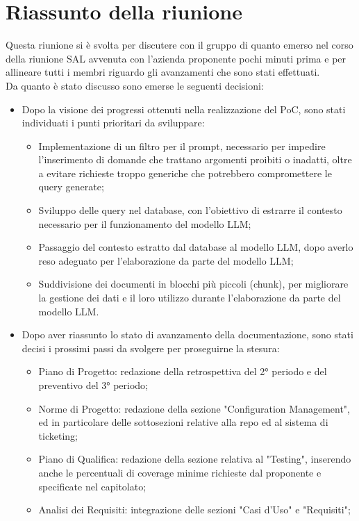 \section{Riassunto della riunione}
Questa riunione si è svolta per discutere con il gruppo di quanto emerso nel corso della riunione SAL avvenuta con l’azienda proponente pochi minuti prima e per allineare tutti i membri riguardo gli avanzamenti che sono stati effettuati.\\
Da quanto è stato discusso sono emerse le seguenti decisioni:
\begin{itemize}
    \item Dopo la visione dei progressi ottenuti nella realizzazione del PoC, sono stati individuati i punti prioritari da sviluppare:
    \begin{itemize}
        \item Implementazione di un filtro per il prompt, necessario per impedire l'inserimento di domande che trattano argomenti proibiti o inadatti, oltre a evitare richieste troppo generiche che potrebbero compromettere le query generate;
        \item Sviluppo delle query nel database, con l'obiettivo di estrarre il contesto necessario per il funzionamento del modello LLM;
        \item Passaggio del contesto estratto dal database al modello LLM, dopo averlo reso adeguato per l'elaborazione da parte del modello LLM;
        \item Suddivisione dei documenti in blocchi più piccoli (chunk), per migliorare la gestione dei dati e il loro utilizzo durante l'elaborazione da parte del modello LLM.
    \end{itemize}
    \item Dopo aver riassunto lo stato di avanzamento della documentazione, sono stati decisi i prossimi passi da svolgere per proseguirne la stesura:
    \begin{itemize}
        \item Piano di Progetto: redazione della retrospettiva del 2° periodo e del preventivo del 3° periodo;
        \item Norme di Progetto: redazione della sezione "Configuration Management", ed in particolare delle sottosezioni relative alla repo ed al sistema di ticketing;
        \item Piano di Qualifica: redazione della sezione relativa al "Testing", inserendo anche le percentuali di coverage minime richieste dal proponente e specificate nel capitolato;
        \item Analisi dei Requisiti: integrazione delle sezioni "Casi d'Uso" e "Requisiti";

\end{itemize}
\end{itemize}
